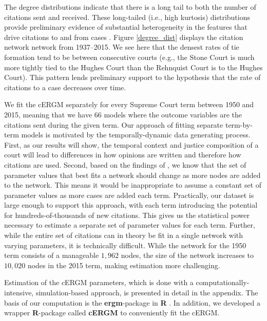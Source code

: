 \documentclass[headsepline=true, abstracton]{scrartcl}
\begin{document}
The degree distributions indicate that there is a long tail to both the number of citations sent and received. These long-tailed (i.e., high kurtosis) distributions provide preliminary evidence of substantial heterogeneity in the features that drive citations to and from cases \citep{strogatz2001exploring}. Figure \ref{degree_dist} displays the citation network network from 1937--2015. We see here that the densest rates of tie formation tend to be between consecutive courts (e.g., the Stone Court is much more tightly tied to the Hughes Court than the Rehnquist Court is to the Hughes Court). This pattern lends preliminary support to the hypothesis that the rate of citations to a case decreases over time.



We fit the cERGM separately for every Supreme Court term between 1950 and 2015, meaning that we have 66 models where the outcome variables are the citations sent during the given term. Our approach of fitting separate term-by-term models is motivated by the temporally-dynamic data generating process. First, as our results will show, the temporal context and justice composition of a court will lead to differences in how opinions are written and therefore how citations are used. Second, based on the findings of \citet{shalizi2013consistency}, we know that the set of parameter values that best fits a network should change as more nodes are added to the network. This means it would be inappropriate to assume a constant set of parameter values as more cases are added each term. Practically, our dataset is large enough to support this approach, with each term introducing the potential for hundreds-of-thousands of new citations. This gives us the statistical power necessary to estimate a separate set of parameter values for each term. Further, while the entire set of citations can in theory be fit in a single network with varying parameters, it is technically difficult. While the network for the 1950 term consists of a manageable $1,962$ nodes, the size of the network increases to $10,020$ nodes in the 2015 term, making estimation more challenging. 

Estimation of the cERGM parameters, which is done with a computationally-intensive, simulation-based approach, is presented in detail in the appendix. The basis of our computation is the \textbf{ergm}-package \citep{HunterDavidR..2008} in \textbf{R} \citep{RCore}. In addition, we developed a wrapper \textbf{R}-package called \textbf{cERGM} \citep{cergm} to conveniently fit the cERGM.
\end{document}
